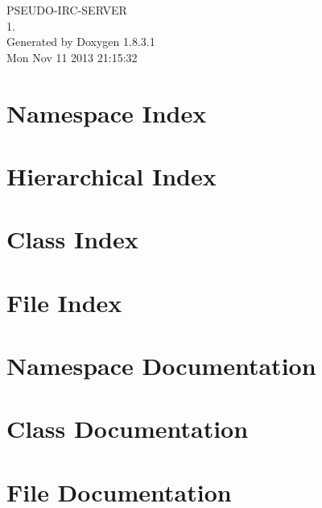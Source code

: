 \documentclass{book}
\begin{document}
\hypersetup{pageanchor=false,citecolor=blue}
\begin{titlepage}
\vspace*{7cm}
\begin{center}
{\Large P\-S\-E\-U\-D\-O-\/\-I\-R\-C-\/\-S\-E\-R\-V\-E\-R \\[1ex]\large 1. }\\
\vspace*{1cm}
{\large Generated by Doxygen 1.8.3.1}\\
\vspace*{0.5cm}
{\small Mon Nov 11 2013 21:15:32}\\
\end{center}
\end{titlepage}
\clearemptydoublepage
{}
\tableofcontents
\clearemptydoublepage
{}
\hypersetup{pageanchor=true,citecolor=blue}
\chapter{Namespace Index}

\chapter{Hierarchical Index}

\chapter{Class Index}

\chapter{File Index}

\chapter{Namespace Documentation}


\chapter{Class Documentation}





















\chapter{File Documentation}





\printindex
\end{document}
